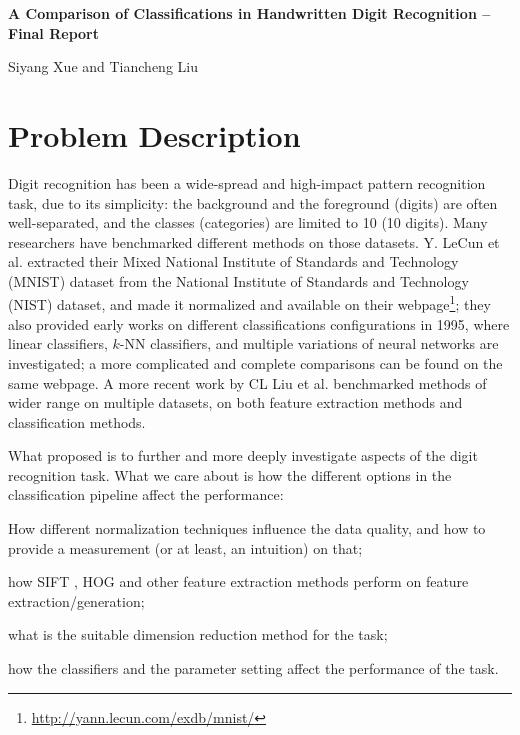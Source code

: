 \documentclass[12pt]{article}
\newenvironment{nscenter}
 {\parskip=0pt\par\nopagebreak\centering}
 {\par\noindent\ignorespacesafterend}
\begin{document}
\thispagestyle{empty}

\bigskip
\bigskip

\begin{nscenter}
\textbf{\Large{A Comparison of Classifications in Handwritten Digit Recognition -- Final Report}}
\end{nscenter}

\bigskip

\begin{nscenter}
{Siyang Xue and Tiancheng Liu}
\end{nscenter}


\section{Problem Description}
\label{sec:problem}


Digit recognition has been a wide-spread and high-impact pattern recognition task, due to its simplicity: the background and the foreground (digits) are often well-separated, and the classes (categories) are limited to 10 (10 digits). Many researchers have benchmarked different methods on those datasets. Y. LeCun et al.\cite{lecun1998gradient} extracted their Mixed National Institute of Standards and Technology (MNIST) dataset from the National Institute of Standards and Technology (NIST) dataset, and made it normalized and available on their webpage\footnote{\url{http://yann.lecun.com/exdb/mnist/}}; they also provided early works on different classifications configurations in 1995, where linear classifiers, $k$-NN classifiers, and multiple variations of neural networks are investigated; a more complicated and complete comparisons can be found on the same webpage. A more recent work by CL Liu et al.\cite{liu2003handwritten} benchmarked methods of wider range on multiple datasets, on both feature extraction methods and classification methods.

What proposed is to further and more deeply investigate aspects of the digit recognition task. What we care about is how the different options in the classification pipeline affect the performance:
\begin{inparaenum} 
\item How different normalization techniques influence the data quality, and how to provide a measurement (or at least, an intuition) on that;
\item how SIFT \cite{lowe2004distinctive}, HOG \cite{dalal2005histograms} and other feature extraction methods perform on feature extraction/generation; 
\item what is the suitable dimension reduction method for the task;
\item how the classifiers and the parameter setting affect the performance of the task.
\end{inparaenum} 
\end{document}
